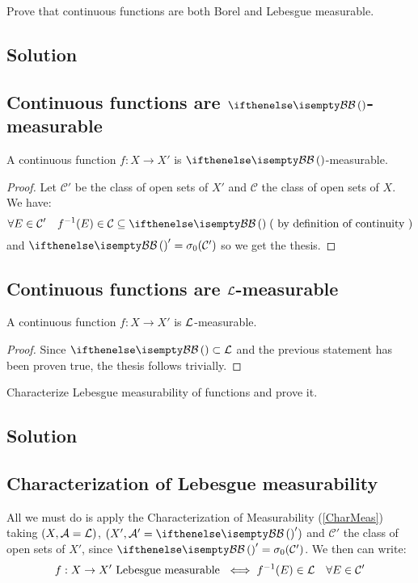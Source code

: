 
\question

Prove that continuous functions are both Borel and Lebesgue measurable.

\subsection*{Solution}

\subsection{Continuous functions are \texorpdfstring{$\B$}{Borel}-measurable}
A continuous function $f:X\to X'$ is $\B$-measurable.

\begin{proof}
    Let $\mathcal{C}'$ be the class of open sets of $X'$ and $\mathcal{C}$ the class of open sets of $X$. We have:
    \[
        \forall E \in \mathcal{C}' \quad f^{-1}(E)\in\mathcal{C} \subseteq \B \; (\text{ by definition of continuity })
    \]
    and $\B'=\sigma_0(\mathcal{C}')$ so we get the thesis.
\end{proof}

\subsection{Continuous functions are \texorpdfstring{$\mathcal{L}$}{Lebesgue}-measurable}
A continuous function $f:X\to X'$ is $\mathcal{L}$-measurable.

\begin{proof}
    Since $\B \subset \Leb$ and the previous statement has been proven true, the thesis follows trivially.
\end{proof}


\question

Characterize Lebesgue measurability of functions and prove it.

\subsection*{Solution}

\subsection{Characterization of Lebesgue measurability}
All we must do is apply the Characterization of Measurability (\ref{CharMeas}) taking $(X,\mathcal{A}=\mathcal{L})$, $(X', \A'=\B')$ and $\mathcal{C}'$ the class of open sets of $X'$, since $\B'=\sigma_0(\mathcal{C}')$. We then can write:
\[
    f:X\to X' \text{ Lebesgue measurable } \iff f^{-1}(E)\in\mathcal{L} \quad \forall E\in\mathcal{C}'
\]

